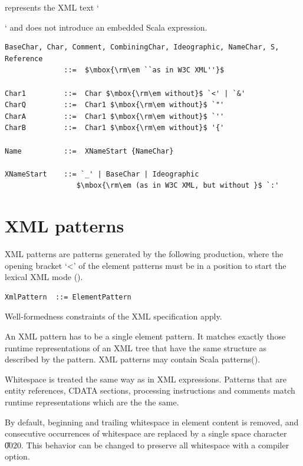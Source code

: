 represents the XML text `{` and does not introduce an embedded Scala 
expression.

\syntax\begin{lstlisting}
BaseChar, Char, Comment, CombiningChar, Ideographic, NameChar, S, Reference
              ::=  $\mbox{\rm\em ``as in W3C XML''}$

Char1         ::=  Char $\mbox{\rm\em without}$ `<' | `&'
CharQ         ::=  Char1 $\mbox{\rm\em without}$ `"'
CharA         ::=  Char1 $\mbox{\rm\em without}$ `''
CharB         ::=  Char1 $\mbox{\rm\em without}$ '{'

Name          ::=  XNameStart {NameChar}

XNameStart    ::= `_' | BaseChar | Ideographic 
                 $\mbox{\rm\em (as in W3C XML, but without }$ `:'

\end{lstlisting}
\section{XML patterns}\label{sec:xml-pats}
XML patterns are patterns generated by the following production, where
the opening bracket `<' of the element patterns must be in a position
to start the lexical XML mode ().

\syntax\begin{lstlisting}
XmlPattern  ::= ElementPattern 
\end{lstlisting}%
Well-formedness constraints of the XML specification apply.

An XML pattern has to be a single element pattern. It %
matches exactly those runtime
representations of an XML tree
that have the same structure as described by the pattern. %
XML patterns may contain Scala patterns().

Whitespace is treated the same way as in XML expressions. Patterns 
that are entity references, CDATA sections, processing 
instructions and comments match runtime representations which are the
the same.

By default, beginning and trailing whitespace in element content is removed, 
and consecutive occurrences of whitespace are replaced by a single space
character \U{0020}. This behavior can be changed to preserve all whitespace
with a compiler option.

}
